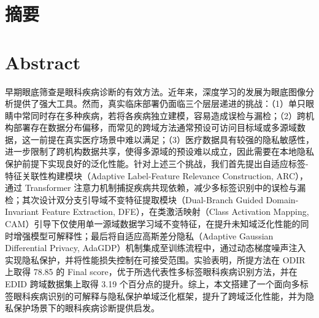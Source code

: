 \section*{摘要}\label{ux6458ux8981}

\section*{Abstract}

早期眼底筛查是眼科疾病诊断的有效方法。近年来，深度学习的发展为眼底图像分析提供了强大工具。然而，真实临床部署仍面临三个层层递进的挑战：（1）单只眼睛中常同时存在多种疾病，若将各疾病独立建模，容易造成误检与漏检；（2）跨机构部署存在数据分布偏移，而常见的跨域方法通常预设可访问目标域或多源域数据，这一前提在真实医疗场景中难以满足；（3）医疗数据具有较强的隐私敏感性，进一步限制了跨机构数据共享，使得多源域的预设难以成立，因此需要在本地隐私保护前提下实现良好的泛化性能。针对上述三个挑战，我们首先提出自适应标签-特征关联性构建模块（Adaptive Label-Feature Relevance Construction, ARC），通过 Transformer 注意力机制捕捉疾病共现依赖，减少多标签识别中的误检与漏检；其次设计双分支引导域不变特征提取模块（Dual-Branch Guided Domain-Invariant Feature Extraction, DFE），在类激活映射（Class Activation Mapping, CAM）引导下仅使用单一源域数据学习域不变特征，在提升未知域泛化性能的同时增强模型可解释性；最后将自适应高斯差分隐私（Adaptive Gaussian Differential Privacy, AdaGDP）机制集成至训练流程中，通过动态梯度噪声注入实现隐私保护，并将性能损失控制在可接受范围。实验表明，所提方法在 ODIR 上取得 78.85 的 Final score，优于所选代表性多标签眼科疾病识别方法，并在 EDID 跨域数据集上取得 3.19 个百分点的提升。综上，本文搭建了一个面向多标签眼科疾病识别的可解释与隐私保护单域泛化框架，提升了跨域泛化性能，并为隐私保护场景下的眼科疾病诊断提供启发。

